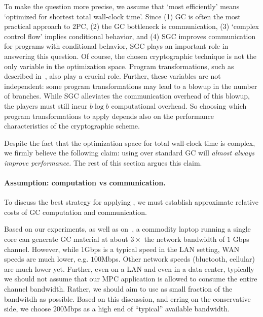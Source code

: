 To make the question more precise, we assume that `most efficiently' means
`optimized for shortest total wall-clock time'.
Since
(1) GC is often the most practical approach to 2PC,
(2) the GC bottleneck is communication,
(3) `complex control flow' implies conditional behavior, and
(4) SGC improves communication for programs with conditional behavior,
SGC plays an important role in answering this question.
%
Of course, the chosen cryptographic technique is not the only variable
in the optimization space.
Program transformations, such as described
in~, also play a crucial role.
%
Further, these variables are not independent:
some program transformations may lead to a blowup in the number of
branches.
While SGC alleviates the communication overhead of this blowup, the
players must still incur $b \log b$ computational overhead.
%
So choosing which program transformations to apply depends also on the
performance characteristics of the cryptographic scheme.

Despite the fact that the optimization space for total wall-clock time
is complex, we firmly believe the following claim:
using \ourschemelong over standard GC will \emph{almost always improve
  performance.}
The rest of this section argues this claim.

\paragraph{Assumption: computation vs communication.} 
To discuss the best strategy for applying \ourscheme, we must establish
approximate relative costs of GC computation and communication. 

 Based
on our experiments, as well as on~\cite{XiaoPersonalComm}, a commodity
laptop running a single core can generate GC material at about $3\times$ the
network bandwidth of $1$ Gbps channel.  
However, while 1Gbps is a typical speed in the LAN setting, WAN
speeds are much lower, e.g. $100$Mbps.  Other network speeds (bluetooth, cellular) are much lower yet.  Further, even on a LAN and even in a data center, typically we should not assume that our MPC application is allowed to consume the entire channel bandwidth. Rather, we should aim to use as small fraction of the bandwitdh as possible.  Based on this discussion, and erring on the conservative side,  we choose $200$Mbps as a high end of  ``typical'' available bandwidth.
%

